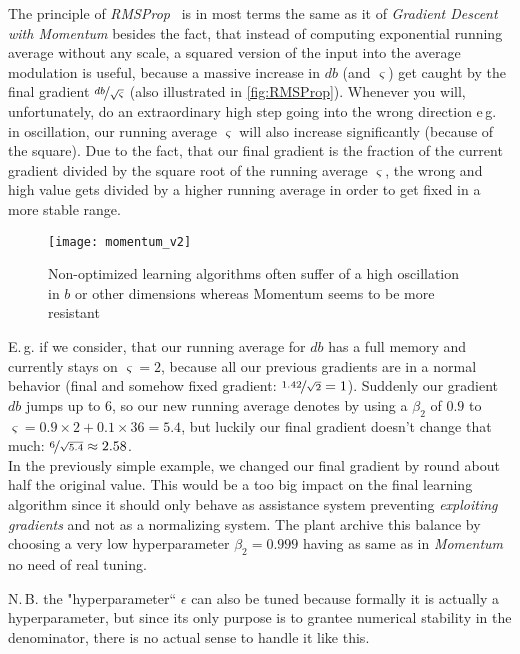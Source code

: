 \documentclass[dvipsnames,twocolumn]{scrartcl}
\begin{document}
	The principle of \emph{RMSProp}~\cite{rmsprop} is in most terms the same as it of \emph{Gradient Descent with Momentum} besides the fact, that instead of computing exponential running average without any scale, a squared version of the input into the average modulation is useful, because a massive increase in $db$ (and $\varsigma$) get caught by the final gradient $\nicefrac{db}{\sqrt{\varsigma}}$ (also illustrated in \autoref{fig:RMSProp}). Whenever you will, unfortunately, do an extraordinary high step going into the wrong direction e\,g. in oscillation, our running average $\varsigma$ will also increase significantly (because of the square). Due to the fact, that our final gradient is the fraction of the current gradient divided by the square root of the running average $\varsigma$, the wrong and high value gets divided by a higher running average in order to get fixed in a more stable range.\\
	
	\begin{figure}
		\caption{Non-optimized learning algorithms often suffer of a high oscillation in $b$ or other dimensions whereas Momentum seems to be more resistant}
		\label{fig:RMSProp}
		\texttt{[image: momentum\_v2]}%
	\end{figure}
	
	E.\,g. if we consider, that our running average for $db$ has a full memory and currently stays on $\varsigma = 2$, because all our previous gradients are in a normal behavior (final and somehow fixed gradient: $\nicefrac{1.42}{\sqrt{2}} = 1$). Suddenly our gradient $db$ jumps up to $6$, so our new running average denotes by using a $\beta_2$ of $0.9$ to $\varsigma = 0.9\times2 + 0.1\times36 = 5.4$, but luckily our final gradient doesn't change that much: $\nicefrac{6}{\sqrt{5.4}} \approx 2.58$.\\
	
	In the previously simple example, we changed our final gradient by round about half the original value. This would be a too big impact on the final learning algorithm since it should only behave as assistance system preventing \emph{exploiting gradients} and not as a normalizing system. The plant archive this balance by choosing a very low hyperparameter $\beta_2 = 0.999$ having as same as in \emph{Momentum} no need of real tuning.
	
	N.\,B. the "hyperparameter`` $\epsilon$ can also be tuned because formally it is actually a hyperparameter, but since its only purpose is to grantee numerical stability in the denominator, there is no actual sense to handle it like this.\\\\
	
\end{document}
